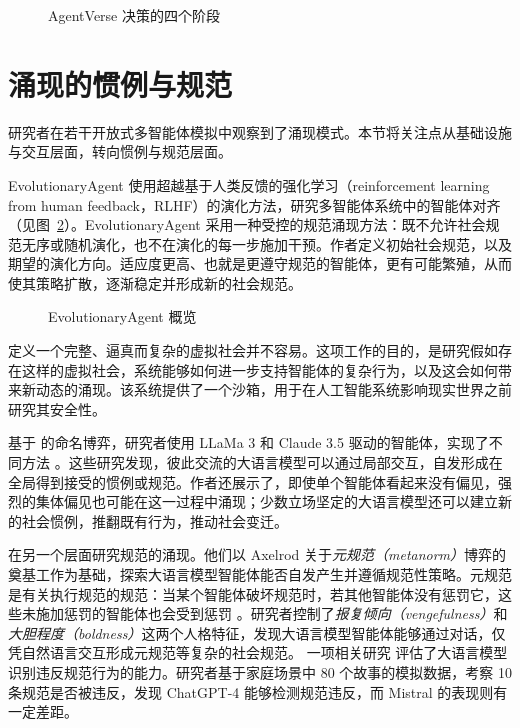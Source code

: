 \begin{figure}
  \begin{center}
    
    \caption{AgentVerse 决策的四个阶段 \citep{chen2023agentverse}}\label{fig:agentverse}
  \end{center}
\end{figure}

\section{涌现的惯例与规范}\label{sec:maswork}
研究者在若干开放式多智能体模拟中观察到了涌现模式。本节将关注点从基础设施与交互层面，转向惯例与规范层面。

EvolutionaryAgent \citep{li2024agent} 使用超越基于人类反馈的强化学习（reinforcement learning from human feedback，RLHF）的演化方法，研究多智能体系统中的智能体对齐（见图~\ref{fig:evolutionary1}）。EvolutionaryAgent 采用一种受控的规范涌现方法：既不允许社会规范无序或随机演化，也不在演化的每一步施加干预。作者定义初始社会规范，以及期望的演化方向。适应度更高、也就是更遵守规范的智能体，更有可能繁殖，从而使其策略扩散，逐渐稳定并形成新的社会规范。
\begin{figure}
  \begin{center}
    
    \caption{EvolutionaryAgent 概览 \citep{li2024agent}}\label{fig:evolutionary1}
  \end{center}
\end{figure}
定义一个完整、逼真而复杂的虚拟社会并不容易。这项工作的目的，是研究假如存在这样的虚拟社会，系统能够如何进一步支持智能体的复杂行为，以及这会如何带来新动态的涌现。该系统提供了一个沙箱，用于在人工智能系统影响现实世界之前研究其安全性。

基于 \citet{steels1995self} 的命名博弈，研究者使用 LLaMa 3 和 Claude 3.5 驱动的智能体，实现了不同方法 \citep{kouwenhoven2024searching, ashery2024dynamics, baronchelli2023shaping}。这些研究发现，彼此交流的大语言模型可以通过局部交互，自发形成在全局得到接受的惯例或规范。作者还展示了，即使单个智能体看起来没有偏见，强烈的集体偏见也可能在这一过程中涌现；少数立场坚定的大语言模型还可以建立新的社会惯例，推翻既有行为，推动社会变迁。

\citet{horiguchi2024evolution} 在另一个层面研究规范的涌现。他们以 Axelrod 关于{\em 元规范（metanorm）}博弈的奠基工作为基础，探索大语言模型智能体能否自发产生并遵循规范性策略。元规范是有关执行规范的规范：当某个智能体破坏规范时，若其他智能体没有惩罚它，这些未施加惩罚的智能体也会受到惩罚 \citep{axelrod1986evolutionary}。研究者控制了{\em 报复倾向（vengefulness）}和{\em 大胆程度（boldness）}这两个人格特征，发现大语言模型智能体能够通过对话，仅凭自然语言交互形成元规范等复杂的社会规范。
一项相关研究 \citep{he2024norm} 评估了大语言模型识别违反规范行为的能力。研究者基于家庭场景中 80 个故事的模拟数据，考察 10 条规范是否被违反，发现 ChatGPT-4 能够检测规范违反，而 Mistral 的表现则有一定差距。

